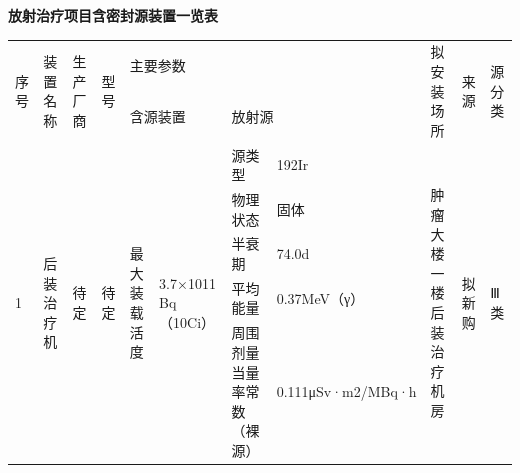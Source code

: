 \vspace{10mm}
\begin{center}
\songti
\setlength{\tabrestwidth}{\dimexpr\textwidth - 2.0cm - 20\tabcolsep - 12\arrayrulewidth\relax}
\textbf{放射治疗项目含密封源装置一览表}\par\vspace{2mm}
\begin{tabular}{|p{2.0cm}|p{}|p{}|p{}|p{}|p{}|p{}|p{}|p{}|p{}|p{}|}
\hline
\multirow{2}{*}{\raggedright 序号} & \multirow{2}{*}{\raggedright 装置名称} & \multirow{2}{*}{\raggedright 生产 厂商} & \multirow{2}{*}{\raggedright 型号} & \multicolumn{4}{|p{\dimexpr \dimexpr\tabrestwidth*66/1000\relax + \dimexpr\tabrestwidth*91/1000\relax + \dimexpr\tabrestwidth*213/1000\relax + \dimexpr\tabrestwidth*176/1000\relax + 6\tabcolsep + 3\arrayrulewidth\relax}|}{\raggedright 主要参数} & \multirow{2}{*}{\raggedright 拟安装场所} & \multirow{2}{*}{\raggedright 来源} & \multirow{2}{*}{\raggedright 源分类} \\
 &  &  &  & \multicolumn{2}{|p{\dimexpr \dimexpr\tabrestwidth*66/1000\relax + \dimexpr\tabrestwidth*91/1000\relax + 2\tabcolsep + 1\arrayrulewidth\relax}|}{\raggedright 含源装置} & \multicolumn{2}{|p{\dimexpr \dimexpr\tabrestwidth*213/1000\relax + \dimexpr\tabrestwidth*176/1000\relax + 2\tabcolsep + 1\arrayrulewidth\relax}|}{\raggedright 放射源} &  &  &  \\
\hline
\multirow{5}{*}{\raggedright 1} & \multirow{5}{*}{\raggedright 后装治疗机} & \multirow{5}{*}{\raggedright 待定} & \multirow{5}{*}{\raggedright 待定} & \multirow{5}{*}{\raggedright 最大装载活度} & \multirow{5}{*}{\raggedright 3.7×1011 Bq（10Ci）} & \raggedright 源类型 & \raggedright 192Ir & \multirow{5}{*}{\raggedright 肿瘤大楼一楼后装治疗机房} & \multirow{5}{*}{\raggedright 拟新购} & \multirow{5}{*}{\raggedright Ⅲ类} \\
 &  &  &  &  &  & \raggedright 物理状态 & \raggedright 固体 &  &  &  \\
 &  &  &  &  &  & \raggedright 半衰期 & \raggedright 74.0d &  &  &  \\
 &  &  &  &  &  & \raggedright 平均能量 & \raggedright 0.37MeV（γ） &  &  &  \\
 &  &  &  &  &  & \raggedright 周围剂量当量率常数（裸源） & \raggedright 0.111μSv·m2/MBq·h &  &  &  \\
\hline
\end{tabular}
\end{center}


